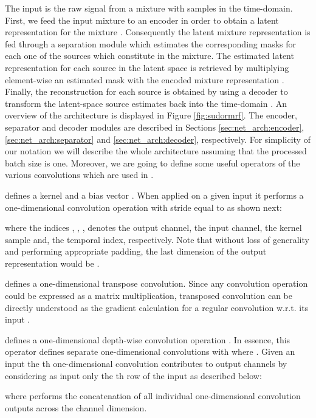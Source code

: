 The input is the raw signal from a mixture  with  samples in the time-domain. First, we feed the input mixture  to an encoder  in order to obtain a latent representation for the mixture . Consequently the latent mixture representation is fed through a separation module  which estimates the corresponding masks  for each one of the  sources  which constitute in the mixture. The estimated latent representation for each source in the latent space  is retrieved by multiplying element-wise an estimated mask  with the encoded mixture representation . Finally, the reconstruction for each source  is obtained by using a decoder  to transform the latent-space  source estimates back into the time-domain . An overview of the \sudo architecture is displayed in Figure \ref{fig:sudormrf}. The encoder, separator and decoder modules are described in Sections \ref{sec:net_arch:encoder}, \ref{sec:net_arch:separator} and \ref{sec:net_arch:decoder}, respectively. For simplicity of our notation we will describe the whole architecture assuming that the processed batch size is one. Moreover, we are going to define some useful operators of the various convolutions which are used in \sudodot.








\begin{definition}
 defines a kernel  and a bias vector . When applied on a given input  it performs a one-dimensional convolution operation with stride equal to  as shown next:

where the indices , , ,  denotes the output channel, the input channel, the kernel sample and, the temporal index, respectively.  Note that without loss of generality and performing appropriate padding, the last dimension of the output representation would be . 
\end{definition}

\begin{definition}
 defines a one-dimensional transpose convolution. Since any convolution operation could be expressed as a matrix multiplication, transposed convolution can be directly understood as the gradient calculation for a regular convolution w.r.t. its input \cite{Simonyan2013DeepIC_transposeconvolution}.
\end{definition}

\begin{definition}
 defines a one-dimensional depth-wise convolution operation \cite{sifre2014depthwiseseparable}. In essence, this operator defines  separate one-dimensional convolutions  with  where . Given an input  the th one-dimensional convolution contributes to  output channels by considering as input only the th row of the input as described below: 

where  performs the concatenation of all individual one-dimensional convolution outputs across the channel dimension. 
\end{definition}


